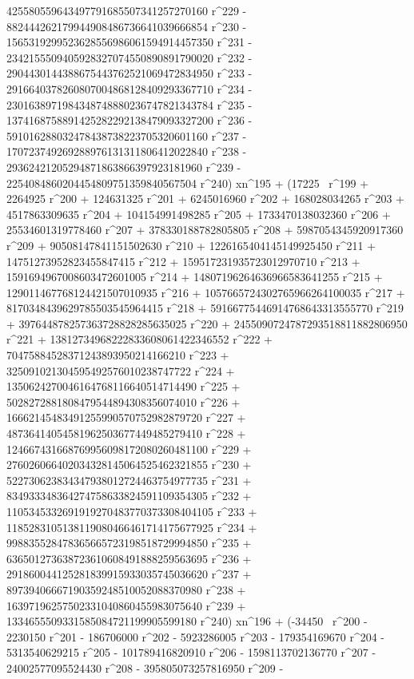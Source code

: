        425580559643497791685507341257270160 r^229 - 
       882444262179944908486736641039666854 r^230 - 
       1565319299523628556986061594914457350 r^231 - 
       2342155509405928327074550890891790020 r^232 - 
       2904430144388675443762521069472834950 r^233 - 
       2916640378260807004868128409293367710 r^234 - 
       2301638971984348748880236747821343784 r^235 - 
       1374168758891425282292138479093327200 r^236 - 
       591016288032478438738223705320601160 r^237 - 
       170723749269288976131311806412022840 r^238 - 
       29362421205294871863866397923181960 r^239 - 
       2254084860204454809751359840567504 r^240) xn^195 + (17225 \
r^199 + 2264925 r^200 + 124631325 r^201 + 6245016960 r^202 + 
       168028034265 r^203 + 4517863309635 r^204 + 
       104154991498285 r^205 + 1733470138032360 r^206 + 
       25534601319778460 r^207 + 378330188782805805 r^208 + 
       5987054345920917360 r^209 + 90508147841151502630 r^210 + 
       1226165404145149925450 r^211 + 14751273952823455847415 r^212 + 
       159517231935723012970710 r^213 + 
       1591694967008603472601005 r^214 + 
       14807196264636966583641255 r^215 + 
       129011467768124421507010935 r^216 + 
       1057665724302765966264100035 r^217 + 
       8170348439629785503545964415 r^218 + 
       59166775446914768643313555770 r^219 + 
       397644878257363728828285635025 r^220 + 
       2455090724787293518811882806950 r^221 + 
       13812734968222833608061422346552 r^222 + 
       70475884528371243893950214166210 r^223 + 
       325091021304595492576010238747722 r^224 + 
       1350624270046164768116640514714490 r^225 + 
       5028272881808479544894308356074010 r^226 + 
       16662145483491255990570752982879720 r^227 + 
       48736414054581962503677449485279410 r^228 + 
       124667431668769956098172080260481100 r^229 + 
       276026066402034328145064525462321855 r^230 + 
       522730623834347938012724463754977735 r^231 + 
       834933348364274758633824591109354305 r^232 + 
       1105345332691919270483770373308404105 r^233 + 
       1185283105138119080466461714175677925 r^234 + 
       998835528478365665723198518729994850 r^235 + 
       636501273638723610608491888259563695 r^236 + 
       291860044125281839915933035745036620 r^237 + 
       89739406667190359248510052088370980 r^238 + 
       16397196257502331040860455983075640 r^239 + 
       1334655509331585084721199905599180 r^240) xn^196 + (-34450 \
r^200 - 2230150 r^201 - 186706000 r^202 - 5923286005 r^203 - 
       179354169670 r^204 - 5313540629215 r^205 - 
       101789416820910 r^206 - 1598113702136770 r^207 - 
       24002577095524430 r^208 - 395805073257816950 r^209 - 
